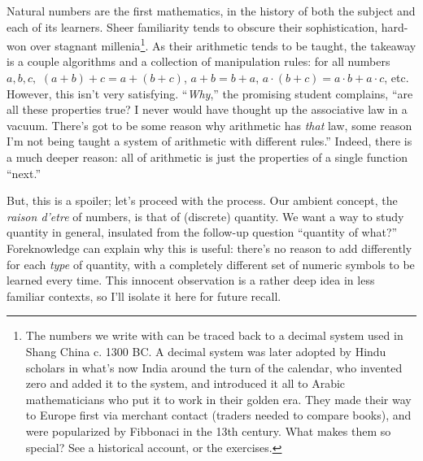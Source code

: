 Natural numbers are the first mathematics, in the history of both the subject and each of its learners.
Sheer familiarity tends to obscure their sophistication, hard-won over stagnant millenia\footnote
{
  The numbers we write with can be traced back to a decimal system used in Shang China c. 1300 BC. %
  A decimal system was later adopted by Hindu scholars in what's now India around the turn of the calendar,
  who invented zero and added it to the system, and introduced it all to Arabic mathematicians who put it to work in their golden era.
  They made their way to Europe first via merchant contact (traders needed to compare books),
  and were popularized by Fibbonaci in the 13th century.
  What makes them so special?
  See a historical account, or the exercises. %
}.
As their arithmetic tends to be taught, the takeaway is a couple algorithms and a collection of manipulation rules: for all numbers $a, b, c,$
$(a + b) + c = a + (b + c)$, $a + b = b + a$, $a \cdot (b + c) = a \cdot b + a \cdot c$, etc.
However, this isn't very satisfying.
``\textit{Why},'' the promising student complains, ``are all these properties true? I never would have thought up the associative law in a vacuum.
There's got to be some reason why arithmetic has \textit{that} law, some reason I'm not being taught a system of arithmetic with different rules.''
Indeed, there is a much deeper reason: all of arithmetic is just the properties of a single function ``next.''

But, this is a spoiler; let's proceed with the process.
Our ambient concept, the \textit{raison d'etre} of numbers, is that of (discrete) quantity.
We want a way to study quantity in general, insulated from the follow-up question ``quantity of what?''
Foreknowledge can explain why this is useful: there's no reason to add differently for each \textit{type} of quantity,
with a completely different set of numeric symbols to be learned every time.
This innocent observation is a rather deep idea in less familiar contexts, so I'll isolate it here for future recall.

\begin{philosophy}
  \label{phil:suppress}
\end{philosophy}


